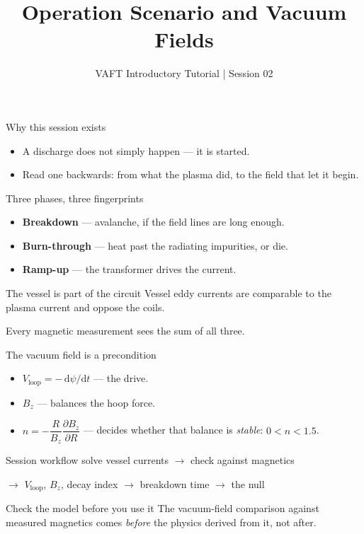 \documentclass[aspectratio=169]{beamer}
\title{Operation Scenario and Vacuum Fields}
\subtitle{VAFT Introductory Tutorial | Session 02}
\author{}
\date{}
\begin{document}
\begin{frame}
  \titlepage
\end{frame}

\begin{frame}{Why this session exists}
  \begin{itemize}
    \item A discharge does not simply happen --- it is started.
    \item Read one backwards: from what the plasma did, to the field that let
      it begin.
  \end{itemize}
\end{frame}

\begin{frame}{Three phases, three fingerprints}
  \begin{itemize}
    \item \textbf{Breakdown} --- avalanche, if the field lines are long enough.
    \item \textbf{Burn-through} --- heat past the radiating impurities, or die.
    \item \textbf{Ramp-up} --- the transformer drives the current.
  \end{itemize}
\end{frame}

\begin{frame}{The vessel is part of the circuit}
  Vessel eddy currents are comparable to the plasma current and oppose the
  coils.

  \vspace{1em}
  Every magnetic measurement sees the sum of all three.
\end{frame}

\begin{frame}{The vacuum field is a precondition}
  \begin{itemize}
    \item \(V_{\mathrm{loop}} = -\,\mathrm{d}\psi/\mathrm{d}t\) --- the drive.
    \item \(B_z\) --- balances the hoop force.
    \item \(n = -\dfrac{R}{B_z}\dfrac{\partial B_z}{\partial R}\) --- decides
      whether that balance is \emph{stable}: \(0 < n < 1.5\).
  \end{itemize}
\end{frame}

\begin{frame}{Session workflow}
  \centering
  solve vessel currents \(\rightarrow\) check against magnetics

  \vspace{0.5em}
  \(\rightarrow\) \(V_{\mathrm{loop}}\), \(B_z\), decay index \(\rightarrow\)
  breakdown time \(\rightarrow\) the null
\end{frame}

\begin{frame}{Check the model before you use it}
  The vacuum-field comparison against measured magnetics comes \emph{before}
  the physics derived from it, not after.
\end{frame}
\end{document}
